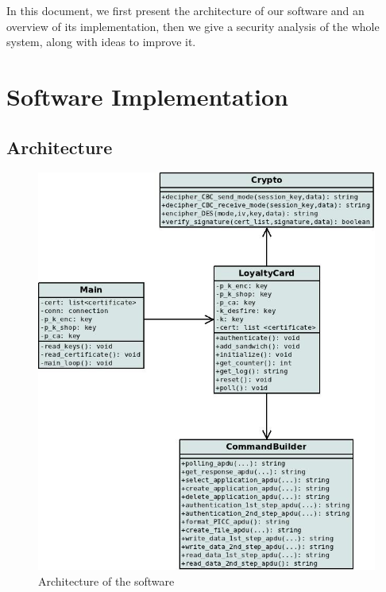 \documentclass[a4paper,11pt,oneside]{article}
\begin{document}
In this document, we first present the architecture of our software and an overview of its implementation, then we give a security analysis of the whole system, along with ideas to improve it. \\


\section{Software Implementation}

\subsection{Architecture}

\begin{figure}[!ht]
	\centering
	\includegraphics[scale=0.50]{Images/ClassDiagram.jpg}
	\caption{Architecture of the software}
	\label{fig:class_diagram}	
\end{figure}
\end{document}

